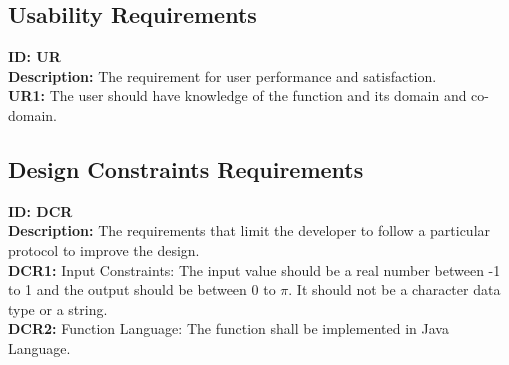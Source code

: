 \documentclass[12pt]{article}
\begin{document}
\subsection{Usability Requirements}
\textbf{ID: UR}\\
\textbf{Description: }The requirement for user performance and satisfaction.\\
	\textbf{UR1: }The user should have knowledge of the function and its domain and co-domain.

\subsection{Design Constraints Requirements}
\textbf{ID: DCR}\\
\textbf{Description: }The requirements that limit the developer to follow a particular protocol to improve the design.\\
\textbf{DCR1: }Input Constraints: The input value should be a real number between -1 to 1 and the output should be between 0 to $\pi$. It should not be a character data type or a string.\\
\textbf{DCR2: }Function Language: The function shall be implemented in Java Language.
\end{document}
